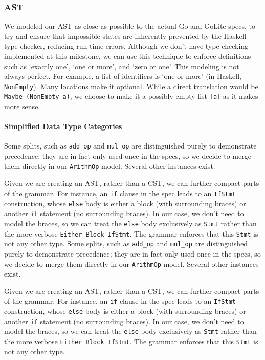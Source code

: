 \documentclass[11pt]{article}
\begin{document}
\subsubsection{AST}
We modeled our AST as close as possible to the actual Go and GoLite
specs, to try and ensure that impossible states are inherently
prevented by the Haskell type checker, reducing run-time errors.
Although we don't have type-checking implemented at this milestone, we
can use this technique to enforce definitions such as `exactly one',
`one or more', and `zero or one'. This modeling is not always
perfect. For example, a
list of
identifiers\cite{gospec:idlist} is `one or more' (in Haskell, \texttt{NonEmpty}). Many
locations make it optional. While a direct translation would be
\texttt{Maybe (NonEmpty a)}, we choose to make it a possibly empty
list \texttt{[a]} as it makes more sense.
\paragraph{Simplified Data Type Categories}
Some splits, such as \texttt{add\_op} and \texttt{mul\_op} are
distinguished purely to demonstrate precedence; they are in fact only
used once in the specs, so we decide to merge them directly in our
\texttt{ArithmOp} model. Several other instances exist.

Given we are creating an AST, rather than a CST, we can further
compact parts of the grammar. For instance, an \texttt{if} clause in
the spec leads to an \texttt{IfStmt} construction, whose \texttt{else}
body is either a block (with surrounding braces) or another
\texttt{if} statement (no surrounding braces). In our case, we don't
need to model the braces, so we can treat the \texttt{else} body
exclusively as \texttt{Stmt} rather than the more verbose
\texttt{Either Block IfStmt}. The grammar enforces that this
\texttt{Stmt} is not any other type.  Some splits, such as
\texttt{add\_op} and \texttt{mul\_op} are distinguished purely to
demonstrate precedence; they are in fact only used once in the specs,
so we decide to merge them directly in our \texttt{ArithmOp}
model. Several other instances exist.

Given we are creating an AST, rather than a CST, we can further
compact parts of the grammar. For instance, an \texttt{if} clause in
the spec leads to an \texttt{IfStmt} construction, whose \texttt{else}
body is either a block (with surrounding braces) or another
\texttt{if} statement (no surrounding braces). In our case, we don't
need to model the braces, so we can treat the \texttt{else} body
exclusively as \texttt{Stmt} rather than the more verbose
\texttt{Either Block IfStmt}. The grammar enforces that this
\texttt{Stmt} is not any other type.
\end{document}
